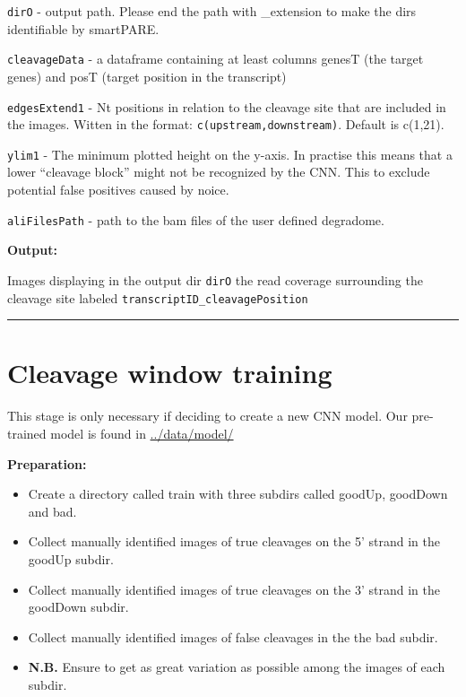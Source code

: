 \documentclass[
]{article}
\providecommand{\tightlist}{%
  \setlength{\itemsep}{0pt}\setlength{\parskip}{0pt}}
\begin{document}
\texttt{dirO} - output path. Please end the path with \_extension to
make the dirs identifiable by smartPARE.

\texttt{cleavageData} - a dataframe containing at least columns genesT
(the target genes) and posT (target position in the transcript)

\texttt{edgesExtend1} - Nt positions in relation to the cleavage site
that are included in the images. Witten in the format:
\texttt{c(upstream,downstream)}. Default is c(1,21).

\texttt{ylim1} - The minimum plotted height on the y-axis. In practise
this means that a lower ``cleavage block'' might not be recognized by
the CNN. This to exclude potential false positives caused by noice.

\texttt{aliFilesPath} - path to the bam files of the user defined
degradome.

\textbf{Output:}

Images displaying in the output dir \texttt{dirO} the read coverage
surrounding the cleavage site labeled
\texttt{transcriptID\_cleavagePosition}

\begin{center}\rule{0.5\linewidth}{0.5pt}\end{center}

\hypertarget{cleavage-window-training}{%
\section{Cleavage window training}\label{cleavage-window-training}}

This stage is only necessary if deciding to create a new CNN model. Our
pre-trained model is found in
\href{../data/model/CNNmodel.h5}{../data/model/}

\textbf{Preparation:}

\begin{itemize}
\tightlist
\item
  Create a directory called train with three subdirs called goodUp,
  goodDown and bad.
\item
  Collect manually identified images of true cleavages on the 5' strand
  in the goodUp subdir.
\item
  Collect manually identified images of true cleavages on the 3' strand
  in the goodDown subdir.
\item
  Collect manually identified images of false cleavages in the the bad
  subdir.
\item
  \textbf{N.B.} Ensure to get as great variation as possible among the
  images of each subdir.\\
\end{itemize}
\end{document}
